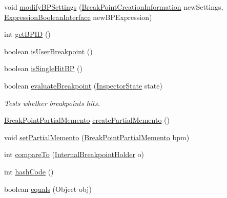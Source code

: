 \begin{DoxyCompactItemize}
void \hyperlink{classgov_1_1nasa_1_1jpf_1_1inspector_1_1server_1_1breakpoints_1_1_internal_breakpoint_holder_a26794cbe7ef91299794c6a87dc1f3fe7}{modify\+B\+P\+Settings} (\hyperlink{interfacegov_1_1nasa_1_1jpf_1_1inspector_1_1interfaces_1_1_break_point_creation_information}{Break\+Point\+Creation\+Information} new\+Settings, \hyperlink{interfacegov_1_1nasa_1_1jpf_1_1inspector_1_1server_1_1expression_1_1_expression_boolean_interface}{Expression\+Boolean\+Interface} new\+B\+P\+Expression)
\item 
int \hyperlink{classgov_1_1nasa_1_1jpf_1_1inspector_1_1server_1_1breakpoints_1_1_internal_breakpoint_holder_a8248867d24ba8b191bda1a68b8df3d82}{get\+B\+P\+ID} ()
\item 
boolean \hyperlink{classgov_1_1nasa_1_1jpf_1_1inspector_1_1server_1_1breakpoints_1_1_internal_breakpoint_holder_a31cb0111774566987e4579247dfe67a1}{is\+User\+Breakpoint} ()
\item 
boolean \hyperlink{classgov_1_1nasa_1_1jpf_1_1inspector_1_1server_1_1breakpoints_1_1_internal_breakpoint_holder_a81e881abeb48f7b348aefe36d39a5e71}{is\+Single\+Hit\+BP} ()
\item 
boolean \hyperlink{classgov_1_1nasa_1_1jpf_1_1inspector_1_1server_1_1breakpoints_1_1_internal_breakpoint_holder_a99d58a39dd0f9553cf706ef6e0896e1f}{evaluate\+Breakpoint} (\hyperlink{interfacegov_1_1nasa_1_1jpf_1_1inspector_1_1server_1_1expression_1_1_inspector_state}{Inspector\+State} state)
\begin{DoxyCompactList}\small\item\em Tests whether breakpoints hits. \end{DoxyCompactList}\item 
\hyperlink{interfacegov_1_1nasa_1_1jpf_1_1inspector_1_1server_1_1breakpoints_1_1_break_point_handler_1_1_break_point_partial_memento}{Break\+Point\+Partial\+Memento} \hyperlink{classgov_1_1nasa_1_1jpf_1_1inspector_1_1server_1_1breakpoints_1_1_internal_breakpoint_holder_a3deab54f350b5fb733d6fd6ffdeb153d}{create\+Partial\+Memento} ()
\item 
void \hyperlink{classgov_1_1nasa_1_1jpf_1_1inspector_1_1server_1_1breakpoints_1_1_internal_breakpoint_holder_aad87e73d6a523ea6e29f378eca84d975}{set\+Partial\+Memento} (\hyperlink{interfacegov_1_1nasa_1_1jpf_1_1inspector_1_1server_1_1breakpoints_1_1_break_point_handler_1_1_break_point_partial_memento}{Break\+Point\+Partial\+Memento} bpm)
\item 
int \hyperlink{classgov_1_1nasa_1_1jpf_1_1inspector_1_1server_1_1breakpoints_1_1_internal_breakpoint_holder_a8c7220041af79ebd7e0f3a27fa42abeb}{compare\+To} (\hyperlink{classgov_1_1nasa_1_1jpf_1_1inspector_1_1server_1_1breakpoints_1_1_internal_breakpoint_holder}{Internal\+Breakpoint\+Holder} o)
\item 
int \hyperlink{classgov_1_1nasa_1_1jpf_1_1inspector_1_1server_1_1breakpoints_1_1_internal_breakpoint_holder_ac170a77d88219c59950e1afcaf29347e}{hash\+Code} ()
\item 
boolean \hyperlink{classgov_1_1nasa_1_1jpf_1_1inspector_1_1server_1_1breakpoints_1_1_internal_breakpoint_holder_a53c594452cf3b091e3d39c2d970ba097}{equals} (Object obj)
\end{DoxyCompactItemize}
